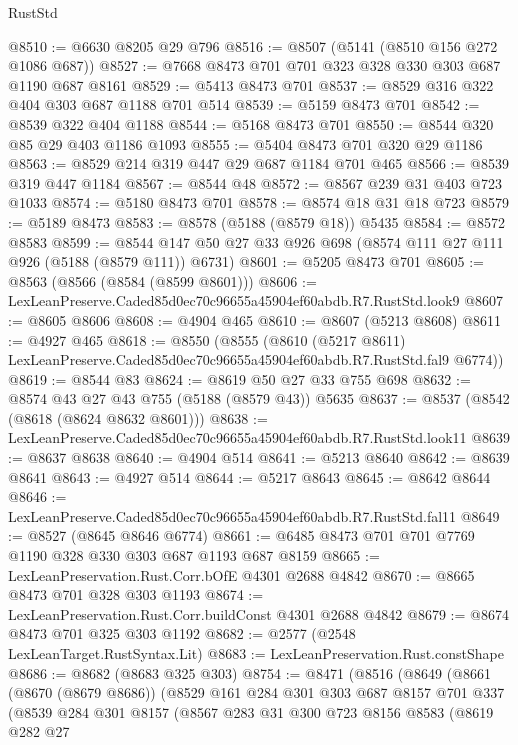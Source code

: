 \begin{lexlean}{RustStd}
\begin{coremodule}
@8510 := @6630 @8205 @29 @796
@8516 := @8507 (@5141 (@8510 @156 @272 @1086 @687))
@8527 := @7668 @8473 @701 @701 @323 @328 @330 @303 @687 @1190 @687 @8161
@8529 := @5413 @8473 @701
@8537 := @8529 @316 @322 @404 @303 @687 @1188 @701 @514
@8539 := @5159 @8473 @701
@8542 := @8539 @322 @404 @1188
@8544 := @5168 @8473 @701
@8550 := @8544 @320 @85 @29 @403 @1186 @1093
@8555 := @5404 @8473 @701 @320 @29 @1186
@8563 := @8529 @214 @319 @447 @29 @687 @1184 @701 @465
@8566 := @8539 @319 @447 @1184
@8567 := @8544 @48
@8572 := @8567 @239 @31 @403 @723 @1033
@8574 := @5180 @8473 @701
@8578 := @8574 @18 @31 @18 @723
@8579 := @5189 @8473
@8583 := @8578 (@5188 (@8579 @18)) @5435
@8584 := @8572 @8583
@8599 := @8544 @147 @50 @27 @33 @926 @698 (@8574 @111 @27 @111 @926 (@5188 (@8579 @111)) @6731)
@8601 := @5205 @8473 @701
@8605 := @8563 (@8566 (@8584 (@8599 @8601)))
@8606 := LexLeanPreserve.Caded85d0ec70c96655a45904ef60abdb.R7.RustStd.look9
@8607 := @8605 @8606
@8608 := @4904 @465
@8610 := @8607 (@5213 @8608)
@8611 := @4927 @465
@8618 := @8550
    (@8555
      (@8610 (@5217 @8611) LexLeanPreserve.Caded85d0ec70c96655a45904ef60abdb.R7.RustStd.fal9 @6774))
@8619 := @8544 @83
@8624 := @8619 @50 @27 @33 @755 @698
@8632 := @8574 @43 @27 @43 @755 (@5188 (@8579 @43)) @5635
@8637 := @8537 (@8542 (@8618 (@8624 @8632 @8601)))
@8638 := LexLeanPreserve.Caded85d0ec70c96655a45904ef60abdb.R7.RustStd.look11
@8639 := @8637 @8638
@8640 := @4904 @514
@8641 := @5213 @8640
@8642 := @8639 @8641
@8643 := @4927 @514
@8644 := @5217 @8643
@8645 := @8642 @8644
@8646 := LexLeanPreserve.Caded85d0ec70c96655a45904ef60abdb.R7.RustStd.fal11
@8649 := @8527 (@8645 @8646 @6774)
@8661 := @6485 @8473 @701 @701 @7769 @1190 @328 @330 @303 @687 @1193 @687 @8159
@8665 := LexLeanPreservation.Rust.Corr.bOfE @4301 @2688 @4842
@8670 := @8665 @8473 @701 @328 @303 @1193
@8674 := LexLeanPreservation.Rust.Corr.buildConst @4301 @2688 @4842
@8679 := @8674 @8473 @701 @325 @303 @1192
@8682 := @2577 (@2548 LexLeanTarget.RustSyntax.Lit)
@8683 := LexLeanPreservation.Rust.constShape
@8686 := @8682 (@8683 @325 @303)
@8754 := @8471
    (@8516
      (@8649
        (@8661
          (@8670 (@8679 @8686))
          (@8529
            @161
            @284
            @301
            @303
            @687
            @8157
            @701
            @337
            (@8539
              @284
              @301
              @8157
              (@8567
                @283
                @31
                @300
                @723
                @8156
                @8583
                (@8619
                  @282
                  @27

\end{coremodule}
\end{lexlean}

